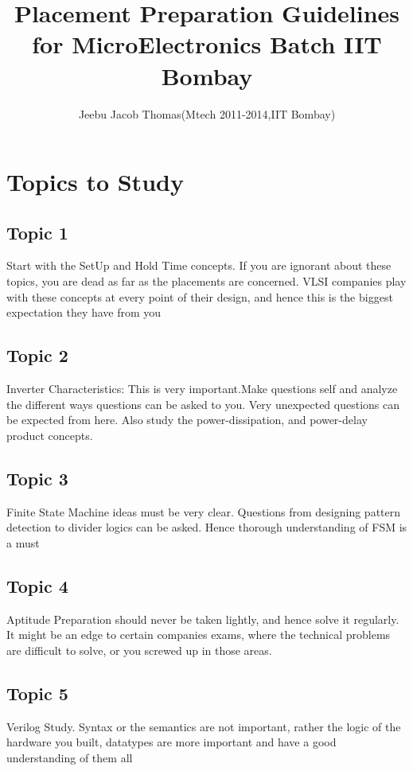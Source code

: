 \documentclass[a4paper,10pt]{article}
\title{Placement Preparation Guidelines for MicroElectronics Batch IIT Bombay}
\author{Jeebu Jacob Thomas(Mtech 2011-2014,IIT Bombay)}
\begin{document}
\maketitle


\section*{Topics to Study} 

\subsection*{Topic 1}
Start with the SetUp and Hold Time concepts. If you are ignorant about these topics, you are dead as far as the placements are concerned. 
VLSI companies play with these concepts at every point of their design, and hence this is the biggest expectation they have from you 

\subsection*{Topic 2}
Inverter Characteristics: This is very important.Make questions self and analyze the  
different ways questions can be asked to you. Very unexpected questions can be
expected from here. Also study the power-dissipation, and power-delay product concepts. 

\subsection*{Topic 3}
Finite State Machine ideas must be very clear. Questions from designing pattern detection to divider logics can be asked. Hence thorough understanding of FSM is a must

\subsection*{Topic 4}
Aptitude Preparation should never be taken lightly, and hence solve it regularly. It might be an edge to certain companies exams, where the technical problems are difficult to solve,
or you screwed up in those areas.

\subsection*{Topic 5}
Verilog Study. Syntax or the semantics are not important, rather the logic of the hardware you built, datatypes are more important and have a good understanding of them all
\end{document}
